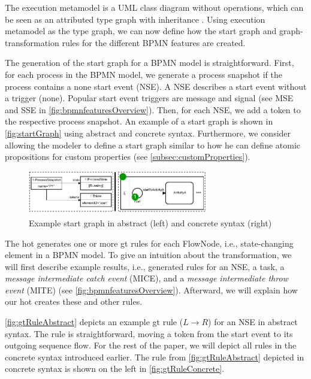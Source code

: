 \documentclass[runningheads]{llncs}
\begin{document}
The execution metamodel is a UML class diagram without operations, which can be seen as an attributed type graph with inheritance \cite{heckelGraphTransformationSoftware2020}.
Using execution metamodel as the type graph, we can now define how the start graph and graph-transformation rules for the different BPMN features are created.

The generation of the start graph for a BPMN model is straightforward.
First, for each process in the BPMN model, we generate a process snapshot if the process contains a none start event (NSE).
A NSE describes a start event without a trigger (none).
Popular start event triggers are message and signal (see MSE and SSE in \autoref{fig:bpmnfeaturesOverview}).
Then, for each NSE, we add a token to the respective process snapshot.
An example of a start graph is shown in \autoref{fig:startGraph} using abstract and concrete syntax.
Furthermore, we consider allowing the modeler to define a start graph similar to how he can define atomic propositions for custom properties (see \autoref{subsec:customProperties}).

\begin{figure}[ht]
    \centering
    \includegraphics[width=0.7\textwidth]{images/startGraph.pdf}
    \caption{Example start graph in abstract (left) and concrete syntax (right)}
    \label{fig:startGraph}
\end{figure}

The \gls*{hot} generates one or more \gls*{gt} rules for each \textsf{FlowNode}, i.e., state-changing element in a BPMN model.
To give an intuition about the transformation, we will first describe example results, i.e., generated rules for an NSE, a task, a \textit{message intermediate catch event} (MICE), and a \textit{message intermediate throw event} (MITE) (see \autoref{fig:bpmnfeaturesOverview}).
Afterward, we will explain how our \gls*{hot} creates these and other rules.

\autoref{fig:gtRuleAbstract} depicts an example \gls*{gt} rule ($L \to R$) for an NSE in abstract syntax.
The rule is straightforward, moving a token from the start event to its outgoing sequence flow.
For the rest of the paper, we will depict all rules in the concrete syntax introduced earlier.
The rule from \autoref{fig:gtRuleAbstract} depicted in concrete syntax is shown on the left in \autoref{fig:gtRuleConcrete}.
\end{document}

